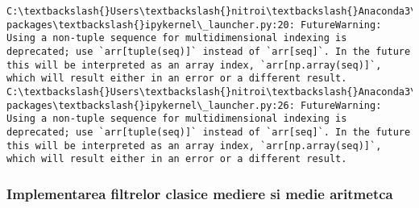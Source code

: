 \documentclass[11pt]{article}
\begin{document}
    \begin{Verbatim}[commandchars=\\\{\}]
C:\textbackslash{}Users\textbackslash{}nitroi\textbackslash{}Anaconda3\textbackslash{}envs\textbackslash{}PAIC\textbackslash{}lib\textbackslash{}site-packages\textbackslash{}ipykernel\_launcher.py:20: FutureWarning: Using a non-tuple sequence for multidimensional indexing is deprecated; use `arr[tuple(seq)]` instead of `arr[seq]`. In the future this will be interpreted as an array index, `arr[np.array(seq)]`, which will result either in an error or a different result.
C:\textbackslash{}Users\textbackslash{}nitroi\textbackslash{}Anaconda3\textbackslash{}envs\textbackslash{}PAIC\textbackslash{}lib\textbackslash{}site-packages\textbackslash{}ipykernel\_launcher.py:26: FutureWarning: Using a non-tuple sequence for multidimensional indexing is deprecated; use `arr[tuple(seq)]` instead of `arr[seq]`. In the future this will be interpreted as an array index, `arr[np.array(seq)]`, which will result either in an error or a different result.

    \end{Verbatim}

    \subsubsection{Implementarea filtrelor clasice mediere si medie
aritmetca}\label{implementarea-filtrelor-clasice-mediere-si-medie-aritmetca}
\end{document}
